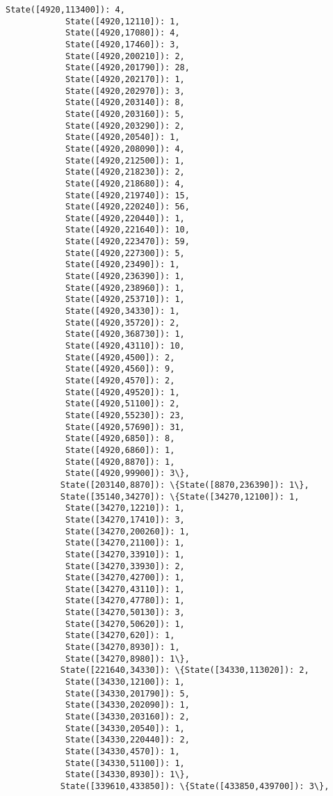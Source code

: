 \documentclass[11pt]{article}
\begin{document}
\begin{Verbatim}[commandchars=\\\{\}]
            State([4920,113400]): 4,
            State([4920,12110]): 1,
            State([4920,17080]): 4,
            State([4920,17460]): 3,
            State([4920,200210]): 2,
            State([4920,201790]): 28,
            State([4920,202170]): 1,
            State([4920,202970]): 3,
            State([4920,203140]): 8,
            State([4920,203160]): 5,
            State([4920,203290]): 2,
            State([4920,20540]): 1,
            State([4920,208090]): 4,
            State([4920,212500]): 1,
            State([4920,218230]): 2,
            State([4920,218680]): 4,
            State([4920,219740]): 15,
            State([4920,220240]): 56,
            State([4920,220440]): 1,
            State([4920,221640]): 10,
            State([4920,223470]): 59,
            State([4920,227300]): 5,
            State([4920,23490]): 1,
            State([4920,236390]): 1,
            State([4920,238960]): 1,
            State([4920,253710]): 1,
            State([4920,34330]): 1,
            State([4920,35720]): 2,
            State([4920,368730]): 1,
            State([4920,43110]): 10,
            State([4920,4500]): 2,
            State([4920,4560]): 9,
            State([4920,4570]): 2,
            State([4920,49520]): 1,
            State([4920,51100]): 2,
            State([4920,55230]): 23,
            State([4920,57690]): 31,
            State([4920,6850]): 8,
            State([4920,6860]): 1,
            State([4920,8870]): 1,
            State([4920,99900]): 3\},
           State([203140,8870]): \{State([8870,236390]): 1\},
           State([35140,34270]): \{State([34270,12100]): 1,
            State([34270,12210]): 1,
            State([34270,17410]): 3,
            State([34270,200260]): 1,
            State([34270,21100]): 1,
            State([34270,33910]): 1,
            State([34270,33930]): 2,
            State([34270,42700]): 1,
            State([34270,43110]): 1,
            State([34270,47780]): 1,
            State([34270,50130]): 3,
            State([34270,50620]): 1,
            State([34270,620]): 1,
            State([34270,8930]): 1,
            State([34270,8980]): 1\},
           State([221640,34330]): \{State([34330,113020]): 2,
            State([34330,12100]): 1,
            State([34330,201790]): 5,
            State([34330,202090]): 1,
            State([34330,203160]): 2,
            State([34330,20540]): 1,
            State([34330,220440]): 2,
            State([34330,4570]): 1,
            State([34330,51100]): 1,
            State([34330,8930]): 1\},
           State([339610,433850]): \{State([433850,439700]): 3\},

\end{Verbatim}
\end{document}
